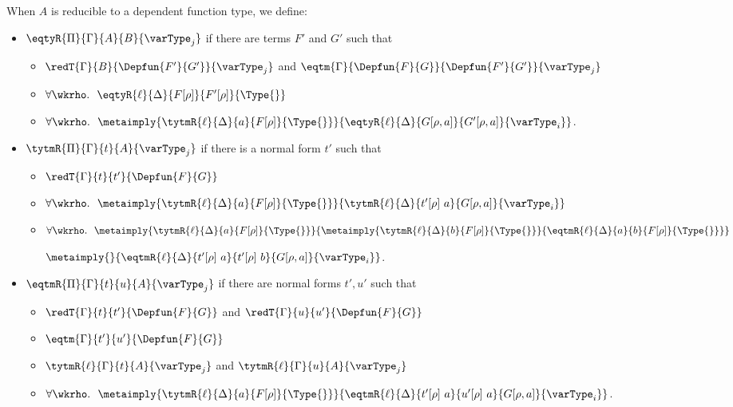When $A$ is reducible to a dependent function type,
we define:
\begin{itemize}
  \item \( \eqtyR{\Pi}{\Gamma}{A}{B}{\varType_j} \) if there are terms \( F' \) and \( G' \) such that
    \begin{itemize}
      \item \( \redT{\Gamma}{B}{\Depfun{F'}{G'}}{\varType_j} \) and
        \( \eqtm{\Gamma}{\Depfun{F}{G}}{\Depfun{F'}{G'}}{\varType_j} \)
      \item \( \forall \wkrho.\ \ \eqtyR{\ell}{\Delta}{F[\rho]}{F'[\rho]}{\Type{}} \)
      \item \( \forall \wkrho.\ \ \metaimply{\tytmR{\ell}{\Delta}{a}{F[\rho]}{\Type{}}}{\eqtyR{\ell}{\Delta}{G[\rho, a]}{G'[\rho, a]}{\varType_i}} \).
      \end{itemize}
    \item \( \tytmR{\Pi}{\Gamma}{t}{A}{{\varType_j}} \) if there is a normal form \( t' \) such that
    \begin{itemize}
      \item \( \redT{\Gamma}{t}{t'}{\Depfun{F}{G}} \)
      \item \( \forall \wkrho.\ \
        \metaimply{\tytmR{\ell}{\Delta}{a}{F[\rho]}{\Type{}}}{\tytmR{\ell}{\Delta}{t'[\rho]\ a}{G[\rho, a]}{\varType_i}} \)
      \item
        $\forall \wkrho.  \  \
              \metaimply{\tytmR{\ell}{\Delta}{a}{F[\rho]}{\Type{}}}
                    {\metaimply{\tytmR{\ell}{\Delta}{b}{F[\rho]}{\Type{}}}
                      {\eqtmR{\ell}{\Delta}{a}{b}{F[\rho]}{\Type{}}}}$

                          \hspace{9.1em}
                          $\metaimply{}{\eqtmR{\ell}{\Delta}{t'[\rho]\ a}{t'[\rho]\ b}{G[\rho,
                                                                    a]}{\varType_i}}$.
    \end{itemize}
  \item \( \eqtmR{\Pi}{\Gamma}{t}{u}{A}{\varType_j} \) if there are normal forms \( t', u' \) such that
    \begin{itemize}
      \item \( \redT{\Gamma}{t}{t'}{\Depfun{F}{G}} \)
      and \( \redT{\Gamma}{u}{u'}{\Depfun{F}{G}} \)
      \item \( \eqtm{\Gamma}{t'}{u'}{\Depfun{F}{G}} \)
      \item \( \tytmR{\ell}{\Gamma}{t}{A}{\varType_j} \) and \( \tytmR{\ell}{\Gamma}{u}{A}{\varType_j} \)
      \item \( \forall \wkrho.\ \ \metaimply{\tytmR{\ell}{\Delta}{a}{F[\rho]}{\Type{}}}{\eqtmR{\ell}{\Delta}{t'[\rho]\ a}{u'[\rho]\ a}{G[\rho, a]}{\varType_i}} \).
    \end{itemize}
  \end{itemize}

